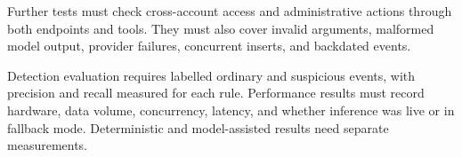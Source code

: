 Further tests must check cross-account access and administrative actions through both endpoints and tools. They must also cover invalid arguments, malformed model output, provider failures, concurrent inserts, and backdated events.

Detection evaluation requires labelled ordinary and suspicious events, with precision and recall measured for each rule. Performance results must record hardware, data volume, concurrency, latency, and whether inference was live or in fallback mode. Deterministic and model-assisted results need separate measurements.

